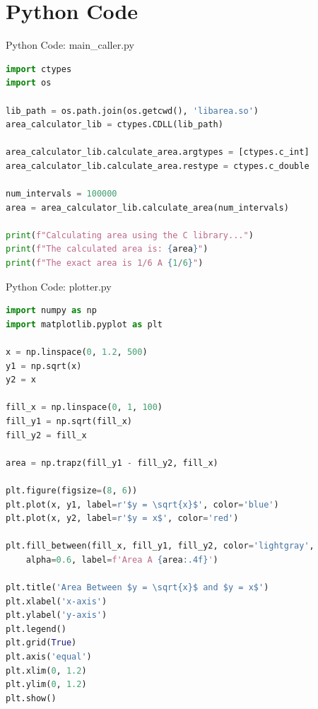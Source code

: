 \documentclass{beamer}
\numberwithin{equation}{section}
\theoremstyle{remark}
\begin{document}
\section{Python Code}
\begin{frame}[fragile]{Python Code: main\_caller.py}
\begin{lstlisting}[language=Python]
import ctypes
import os

lib_path = os.path.join(os.getcwd(), 'libarea.so')
area_calculator_lib = ctypes.CDLL(lib_path)

area_calculator_lib.calculate_area.argtypes = [ctypes.c_int]
area_calculator_lib.calculate_area.restype = ctypes.c_double

num_intervals = 100000
area = area_calculator_lib.calculate_area(num_intervals)

print(f"Calculating area using the C library...")
print(f"The calculated area is: {area}")
print(f"The exact area is 1/6 A {1/6}")
\end{lstlisting}
\end{frame}

\begin{frame}[fragile]{Python Code: plotter.py}
\begin{lstlisting}[language=Python]
import numpy as np
import matplotlib.pyplot as plt

x = np.linspace(0, 1.2, 500)
y1 = np.sqrt(x)
y2 = x

fill_x = np.linspace(0, 1, 100)
fill_y1 = np.sqrt(fill_x)
fill_y2 = fill_x

area = np.trapz(fill_y1 - fill_y2, fill_x)

plt.figure(figsize=(8, 6))
plt.plot(x, y1, label=r'$y = \sqrt{x}$', color='blue')
plt.plot(x, y2, label=r'$y = x$', color='red')

plt.fill_between(fill_x, fill_y1, fill_y2, color='lightgray', 
    alpha=0.6, label=f'Area A {area:.4f}')

plt.title('Area Between $y = \sqrt{x}$ and $y = x$')
plt.xlabel('x-axis')
plt.ylabel('y-axis')
plt.legend()
plt.grid(True)
plt.axis('equal')
plt.xlim(0, 1.2)
plt.ylim(0, 1.2)
plt.show()
\end{lstlisting}
\end{frame}
\end{document}

